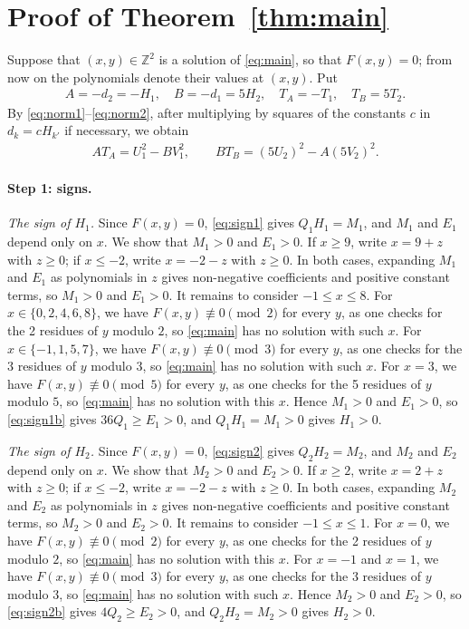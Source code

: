\documentclass[11pt]{article}
\newcommand{\Z}{\mathbb{Z}}
\begin{document}
\section{Proof of Theorem~\ref{thm:main}}

Suppose that $(x,y)\in\Z^2$ is a solution of \eqref{eq:main}, so that $F(x,y)=0$; from now on the polynomials denote their values at $(x,y)$. Put
\begin{gather*}
A=-d_{2}=-H_{1},\quad B=-d_{1}=5H_{2},\quad T_A=-T_{1},\quad T_B=5T_{2}.
\end{gather*}
By \eqref{eq:norm1}--\eqref{eq:norm2}, after multiplying by squares of the constants $c$ in $d_k=cH_{k'}$ if necessary, we obtain
\begin{align}
AT_A=U_{1}^2-BV_{1}^2,\qquad BT_B=(5U_{2})^2-A(5V_{2})^2.\label{eq:AB}
\end{align}

\paragraph{Step 1: signs.} \emph{The sign of $H_{1}$.} Since $F(x,y)=0$, \eqref{eq:sign1} gives $Q_{1}H_{1}=M_{1}$, and $M_{1}$ and $E_{1}$ depend only on $x$. We show that $M_{1}>0$ and $E_{1}>0$. If $x\geq9$, write $x=9+z$ with $z\geq0$; if $x\leq-2$, write $x=-2-z$ with $z\geq0$. In both cases, expanding $M_{1}$ and $E_{1}$ as polynomials in $z$ gives non-negative coefficients and positive constant terms, so $M_{1}>0$ and $E_{1}>0$. It remains to consider $-1\leq x\leq8$. For $x\in\{0,\allowbreak 2,\allowbreak 4,\allowbreak 6,\allowbreak 8\}$, we have $F(x,y)\not\equiv0\pmod{2}$ for every $y$, as one checks for the 2 residues of $y$ modulo $2$, so \eqref{eq:main} has no solution with such $x$. For $x\in\{-1,\allowbreak 1,\allowbreak 5,\allowbreak 7\}$, we have $F(x,y)\not\equiv0\pmod{3}$ for every $y$, as one checks for the 3 residues of $y$ modulo $3$, so \eqref{eq:main} has no solution with such $x$. For $x=3$, we have $F(x,y)\not\equiv0\pmod{5}$ for every $y$, as one checks for the 5 residues of $y$ modulo $5$, so \eqref{eq:main} has no solution with this $x$. Hence $M_{1}>0$ and $E_{1}>0$, so \eqref{eq:sign1b} gives $36Q_{1}\geq E_{1}>0$, and $Q_{1}H_{1}=M_{1}>0$ gives $H_{1}>0$.

\emph{The sign of $H_{2}$.} Since $F(x,y)=0$, \eqref{eq:sign2} gives $Q_{2}H_{2}=M_{2}$, and $M_{2}$ and $E_{2}$ depend only on $x$. We show that $M_{2}>0$ and $E_{2}>0$. If $x\geq2$, write $x=2+z$ with $z\geq0$; if $x\leq-2$, write $x=-2-z$ with $z\geq0$. In both cases, expanding $M_{2}$ and $E_{2}$ as polynomials in $z$ gives non-negative coefficients and positive constant terms, so $M_{2}>0$ and $E_{2}>0$. It remains to consider $-1\leq x\leq1$. For $x=0$, we have $F(x,y)\not\equiv0\pmod{2}$ for every $y$, as one checks for the 2 residues of $y$ modulo $2$, so \eqref{eq:main} has no solution with this $x$. For $x=-1$ and $x=1$, we have $F(x,y)\not\equiv0\pmod{3}$ for every $y$, as one checks for the 3 residues of $y$ modulo $3$, so \eqref{eq:main} has no solution with such $x$. Hence $M_{2}>0$ and $E_{2}>0$, so \eqref{eq:sign2b} gives $4Q_{2}\geq E_{2}>0$, and $Q_{2}H_{2}=M_{2}>0$ gives $H_{2}>0$.
\end{document}
